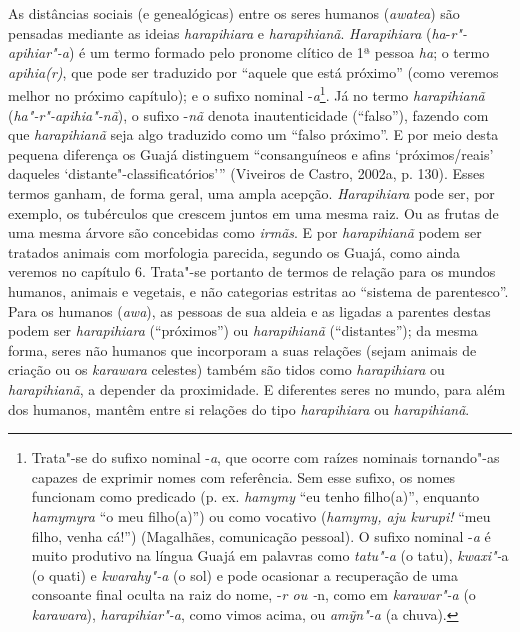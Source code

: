 As distâncias sociais (e genealógicas) entre os seres humanos
(\emph{awatea}) são pensadas mediante as ideias \emph{harapihiara} e
\emph{harapihianã}. \emph{Harapihiara} (\emph{ha}-\emph{r"-apihiar"-a}) é
um termo formado pelo pronome clítico de 1ª pessoa \emph{ha}; o termo
\emph{apihia(r)}, que pode ser traduzido por ``aquele que está próximo''
(como veremos melhor no próximo capítulo); e o sufixo nominal
-\emph{a}\footnote{Trata"-se do sufixo nominal -\emph{a}, que ocorre com
  raízes nominais tornando"-as capazes de exprimir nomes com referência.
  Sem esse sufixo, os nomes funcionam como predicado (p. ex. \emph{hamymy} ``eu tenho filho(a)'', enquanto \emph{hamymyra} ``o meu
  filho(a)'') ou como vocativo (\emph{hamymy, aju kurupi!} ``meu filho,
  venha cá!'') (Magalhães, comunicação pessoal). O sufixo nominal
  -\emph{a} é muito produtivo na língua Guajá em palavras como
  \emph{tatu"-a} (o tatu), \emph{kwaxi"-}a (o quati) e \emph{kwarahy"-a} (o
  sol) e pode ocasionar a recuperação de uma consoante final oculta na
  raiz do nome, -\emph{r ou -}n, como em \emph{karawar"-a} (o
  \emph{karawara}), \emph{harapihiar"-a}, como vimos acima, ou
  \emph{amỹn"-a} (a chuva).}. Já no termo \emph{harapihianã}
(\emph{ha"-r"-apihia"-nã}), o sufixo -\emph{nã} denota inautenticidade
(``falso''), fazendo com que \emph{harapihianã} seja algo traduzido como
um ``falso próximo''. E por meio desta pequena diferença os Guajá
distinguem ``consanguíneos e afins `próximos/reais' daqueles
`distante"-classificatórios''' (Viveiros de Castro, 2002a, p. 130). Esses
termos ganham, de forma geral, uma ampla acepção. \emph{Harapihiara}
pode ser, por exemplo, os tubérculos que crescem juntos em uma mesma
raiz. Ou as frutas de uma mesma árvore são concebidas como \emph{irmãs}.
E por \emph{harapihianã} podem ser tratados animais com morfologia
parecida, segundo os Guajá, como ainda veremos no capítulo 6. Trata"-se
portanto de termos de relação para os mundos humanos, animais e
vegetais, e não categorias estritas ao ``sistema de parentesco''. Para
os humanos (\emph{awa}), as pessoas de sua aldeia e as ligadas a
parentes destas podem ser \emph{harapihiara} (``próximos'') ou
\emph{harapihianã} (``distantes''); da mesma forma, seres não humanos que
incorporam a suas relações (sejam animais de criação ou os
\emph{karawara} celestes) também são tidos como \emph{harapihiara} ou
\emph{harapihianã}, a depender da proximidade. E diferentes seres no
mundo, para além dos humanos, mantêm entre si relações do tipo
\emph{harapihiara} ou \emph{harapihianã}.

